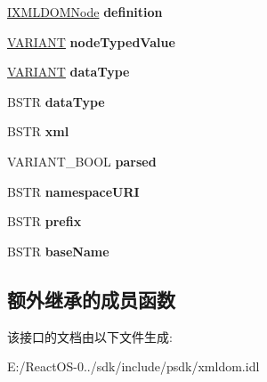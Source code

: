 \begin{DoxyCompactItemize}
\item 
\mbox{\label{interface_i_x_m_l_d_o_m_node_a9144ac0704576b3a02f180d40b870a90}} 
\hyperlink{interface_i_x_m_l_d_o_m_node}{I\+X\+M\+L\+D\+O\+M\+Node} {\bfseries definition}
\item 
\mbox{\label{interface_i_x_m_l_d_o_m_node_af4b99a6537621d4a6170b9b91de22b31}} 
\hyperlink{structtag_v_a_r_i_a_n_t}{V\+A\+R\+I\+A\+NT} {\bfseries node\+Typed\+Value}
\item 
\mbox{\label{interface_i_x_m_l_d_o_m_node_a08decf3180b385734ae1969a7bd5ef48}} 
\hyperlink{structtag_v_a_r_i_a_n_t}{V\+A\+R\+I\+A\+NT} {\bfseries data\+Type}
\item 
\mbox{\label{interface_i_x_m_l_d_o_m_node_a53a93af3899ebb95b2764e730589d6b8}} 
B\+S\+TR {\bfseries data\+Type}
\item 
\mbox{\label{interface_i_x_m_l_d_o_m_node_a23242126dadb571e75a7c4d8ddae4ee4}} 
B\+S\+TR {\bfseries xml}
\item 
\mbox{\label{interface_i_x_m_l_d_o_m_node_ae5354a7ce0409958708ef4db29806666}} 
V\+A\+R\+I\+A\+N\+T\+\_\+\+B\+O\+OL {\bfseries parsed}
\item 
\mbox{\label{interface_i_x_m_l_d_o_m_node_a2a82b99bf1bd82f5b71eec4c7c6f209c}} 
B\+S\+TR {\bfseries namespace\+U\+RI}
\item 
\mbox{\label{interface_i_x_m_l_d_o_m_node_a1cbde04fa8073d638fa39d86c98f8fdb}} 
B\+S\+TR {\bfseries prefix}
\item 
\mbox{\label{interface_i_x_m_l_d_o_m_node_a93c88cafbeaeba4d5f61a1158c90a231}} 
B\+S\+TR {\bfseries base\+Name}
\end{DoxyCompactItemize}
\subsection*{额外继承的成员函数}


该接口的文档由以下文件生成\+:\begin{DoxyCompactItemize}
\item 
E\+:/\+React\+O\+S-\/0../sdk/include/psdk/xmldom.\+idl\end{DoxyCompactItemize}
